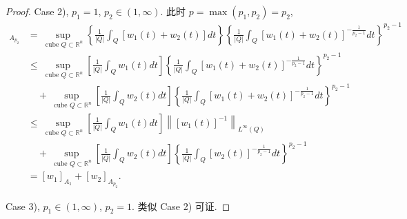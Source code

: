 \documentclass[a4paper,11pt]{article}
\theoremstyle{definition}
\begin{document}
\begin{proof}
    Case 2), $ p_1 = 1 $, $ p_2 \in (1, \infty) $. 此时 $ p = \max(p_1, p_2) = p_2 $,
    \begin{align*}
        [w_1 + w_2]_{A_{p_2}} 
            &= \sup_{\text{ cube } Q \subset \mathbb{R}^n} 
                \left\{ \frac{1}{|Q|} \int_Q [w_1(t) + w_2(t)] dt \right\}
                \left\{ \frac{1}{|Q|} \int_Q [w_1(t) + w_2(t)]^{-\frac{1}{p_2 - 1}}dt \right\}^{p_2 - 1} \\
            &\leq \sup_{\text{ cube } Q \subset \mathbb{R}^n} 
                \left[ \frac{1}{|Q|} \int_Q w_1(t)  dt \right]
                \left\{ \frac{1}{|Q|} \int_Q [w_1(t) + w_2(t)]^{-\frac{1}{p_2 - 1}}dt \right\}^{p_2 - 1} \\
                &\quad+ \sup_{\text{ cube } Q \subset \mathbb{R}^n} 
                    \left[ \frac{1}{|Q|} \int_Q w_2(t)  dt \right] 
                    \left\{ \frac{1}{|Q|} \int_Q [w_1(t) + w_2(t)]^{-\frac{1}{p_2 - 1}}dt \right\}^{p_2 - 1} \\
            &\leq \sup_{\text{ cube } Q \subset \mathbb{R}^n} 
                \left[ \frac{1}{|Q|} \int_Q w_1(t)  dt \right]
                \left\| [w_1(t)]^{-1} \right\|_{L^\infty (Q)} \\
                &\quad+ \sup_{\text{ cube } Q \subset \mathbb{R}^n} 
                    \left[ \frac{1}{|Q|} \int_Q w_2(t)  dt \right] 
                    \left\{ \frac{1}{|Q|} \int_Q [w_2(t)]^{-\frac{1}{p_2 - 1}}dt \right\}^{p_2 - 1} \\
            &= [w_1]_{A_1} + [w_2]_{A_{p_2}}.
    \end{align*}
    
    Case 3), $ p_1 \in (1, \infty) $, $ p_2 = 1 $. 类似 Case 2) 可证.
    

\end{proof}
\end{document}

